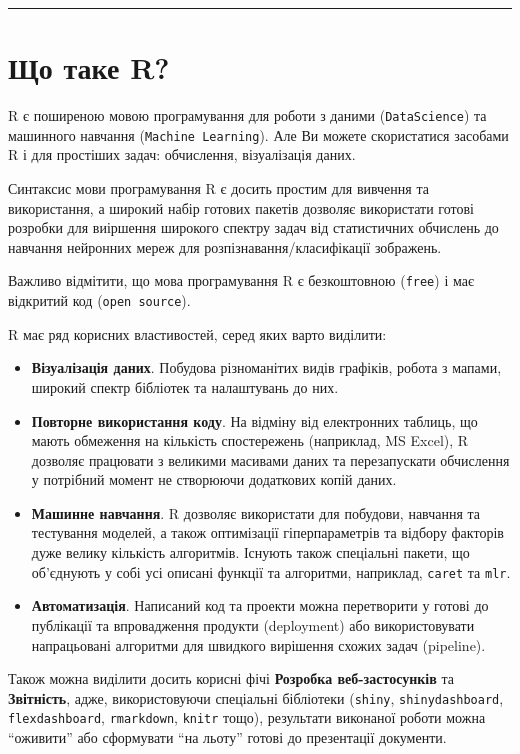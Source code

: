 \documentclass[
]{book}
\begin{document}
\begin{center}\rule{0.5\linewidth}{0.5pt}\end{center}

\hypertarget{chapter11}{%
\section{Що таке R?}\label{chapter11}}

R є поширеною мовою програмування для роботи з даними (\texttt{DataScience}) та машинного навчання (\texttt{Machine\ Learning}). Але Ви можете скористатися засобами R і для простіших задач: обчислення, візуалізація даних.

Синтаксис мови програмування R є досить простим для вивчення та використання, а широкий набір готових пакетів дозволяє використати готові розробки для виіршення широкого спектру задач від статистичних обчислень до навчання нейронних мереж для розпізнавання/класифікації зображень.

Важливо відмітити, що мова програмування R є безкоштовною (\texttt{free}) і має відкритий код (\texttt{open\ source}).

R має ряд корисних властивостей, серед яких варто виділити:

\begin{itemize}
\item
  \textbf{Візуалізація даних}. Побудова різноманітих видів графіків, робота з мапами, широкий спектр бібліотек та налаштувань до них.
\item
  \textbf{Повторне використання коду}. На відміну від електронних таблиць, що мають обмеження на кількість спостережень (наприклад, MS Excel), R дозволяє працювати з великими масивами даних та перезапускати обчислення у потрібний момент не створюючи додаткових копій даних.
\item
  \textbf{Машинне навчання}. R дозволяє використати для побудови, навчання та тестування моделей, а також оптимізації гіперпараметрів та відбору факторів дуже велику кількість алгоритмів. Існують також спеціальні пакети, що об'єднують у собі усі описані функції та алгоритми, наприклад, \texttt{caret} та \texttt{mlr}.
\item
  \textbf{Автоматизація}. Написаний код та проекти можна перетворити у готові до публікації та впровадження продукти (deployment) або використовувати напрацьовані алгоритми для швидкого вирішення схожих задач (pipeline).
\end{itemize}

Також можна виділити досить корисні фічі \textbf{Розробка веб-застосунків} та \textbf{Звітність}, адже, використовуючи спеціальні бібліотеки (\texttt{shiny}, \texttt{shinydashboard}, \texttt{flexdashboard}, \texttt{rmarkdown}, \texttt{knitr} тощо), результати виконаної роботи можна ``оживити'' або сформувати ``на льоту'' готові до презентації документи.
\end{document}
